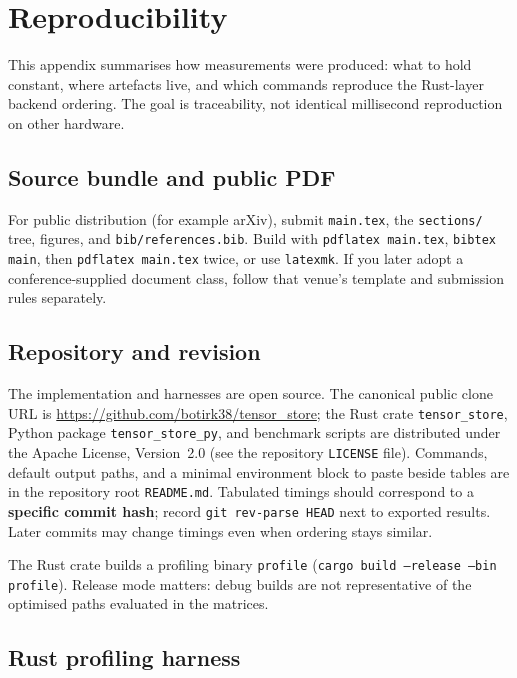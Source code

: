 \section{Reproducibility}
\label{app:repro}

This appendix summarises how measurements were produced: what to hold constant, where artefacts live, and which commands reproduce the Rust-layer backend ordering. The goal is traceability, not identical millisecond reproduction on other hardware.

\subsection{Source bundle and public PDF}

For public distribution (for example arXiv), submit \texttt{main.tex}, the \texttt{sections/} tree, figures, and \texttt{bib/references.bib}. Build with \texttt{pdflatex main.tex}, \texttt{bibtex main}, then \texttt{pdflatex main.tex} twice, or use \texttt{latexmk}. If you later adopt a conference-supplied document class, follow that venue's template and submission rules separately.

\subsection{Repository and revision}

The implementation and harnesses are open source. The canonical public clone URL is \url{https://github.com/botirk38/tensor_store}; the Rust crate \texttt{tensor\_store}, Python package \texttt{tensor\_store\_py}, and benchmark scripts are distributed under the Apache License, Version~2.0 (see the repository \texttt{LICENSE} file). Commands, default output paths, and a minimal environment block to paste beside tables are in the repository root \texttt{README.md}. Tabulated timings should correspond to a \textbf{specific commit hash}; record \texttt{git rev-parse HEAD} next to exported results. Later commits may change timings even when ordering stays similar.

The Rust crate builds a profiling binary \texttt{profile} (\texttt{cargo build --release --bin profile}). Release mode matters: debug builds are not representative of the optimised paths evaluated in the matrices.

\subsection{Rust profiling harness}


